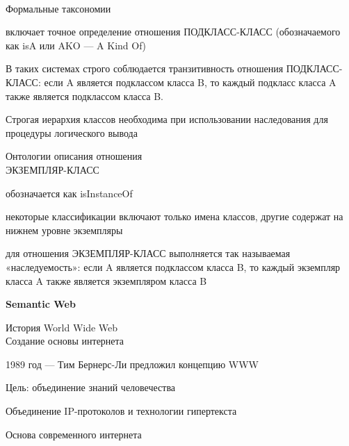 \begin{frame}{\\Формальные таксономии}
	\topline
	\justifying
	
	\vspace{10mm}
	\begin{textitemize}
		\item включает точное определение отношения ПОДКЛАСС-КЛАСС (обозначаемого как isA или AKO --- A Kind Of)
		\item В таких системах строго соблюдается транзитивность отношения ПОДКЛАСС-КЛАСС: если A является подклассом класса B, то каждый подкласс класса A также является подклассом класса B.
		\item Строгая иерархия классов необходима при использовании наследования для процедуры логического вывода
	\end{textitemize}
	
\end{frame}

\begin{frame}{Онтологии описания отношения\\ЭКЗЕМПЛЯР-КЛАСС}
	\topline
	\justifying
	
	\vspace{10mm}
	\begin{textitemize}
		\item обозначается как isInstanceOf
		\item некоторые классификации включают только имена классов, другие содержат на нижнем уровне экземпляры
		\item для отношения ЭКЗЕМПЛЯР-КЛАСС выполняется так называемая «наследуемость»: если A является подклассом класса B, то каждый экземпляр класса A также является экземпляром класса B
	\end{textitemize}
	
\end{frame}

\begin{frame}{}
	
	\centering
	
	\Huge
	
	\textbf{Semantic Web}
	
\end{frame}


\begin{frame}{История World Wide Web\\Создание основы интернета}
	\topline
	\justifying
	\begin{textitemize}
		\item 1989 год --- Тим Бернерс-Ли предложил концепцию WWW
		\item Цель: объединение знаний человечества
		\item Объединение IP-протоколов и технологии гипертекста
		\item Основа современного интернета
	\end{textitemize}
\end{frame}

